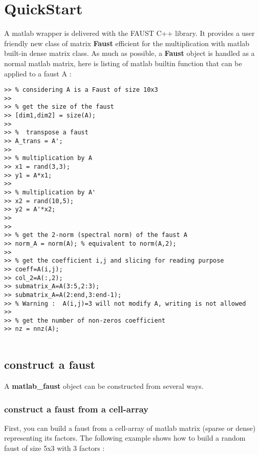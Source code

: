 \chapter{QuickStart}\label{sec:firstUse}


A matlab wrapper is delivered with the FAUST C++ library.
It provides a user friendly new class of matrix \textbf{Faust} efficient for the multiplication with matlab built-in dense matrix class.\newline
\newline
As much as possible, a \textbf{Faust} object is handled as a normal matlab matrix, here is listing of matlab builtin function that can be applied to a faust A :



\begin{lstlisting}
>> % considering A is a Faust of size 10x3
>>
>> % get the size of the faust
>> [dim1,dim2] = size(A);
>>
>> %  transpose a faust  
>> A_trans = A'; 		 
>> 
>> % multiplication by A
>> x1 = rand(3,3);
>> y1 = A*x1;  
>> 
>> % multiplication by A'
>> x2 = rand(10,5);
>> y2 = A'*x2;
>>
>>
>> % get the 2-norm (spectral norm) of the faust A
>> norm_A = norm(A); % equivalent to norm(A,2);
>>
>> % get the coefficient i,j and slicing for reading purpose
>> coeff=A(i,j);
>> col_2=A(:,2);
>> submatrix_A=A(3:5,2:3);
>> submatrix_A=A(2:end,3:end-1);
>> % Warning :  A(i,j)=3 will not modify A, writing is not allowed
>>
>> % get the number of non-zeros coefficient
>> nz = nnz(A);
  
\end{lstlisting}



\section{construct a faust}\label{sec:firstUseBuild}

A \textbf{matlab{\_}faust} object can be constructed from several ways.
\subsection{construct a faust from a cell-array}\label{sec:firstUseBuildFromCellArray}
First, you can build a faust from a cell-array of matlab matrix (sparse or dense) representing its factors.
\newline
\newline
The following example shows how to build a random faust of size 5x3 with 3 factors :

